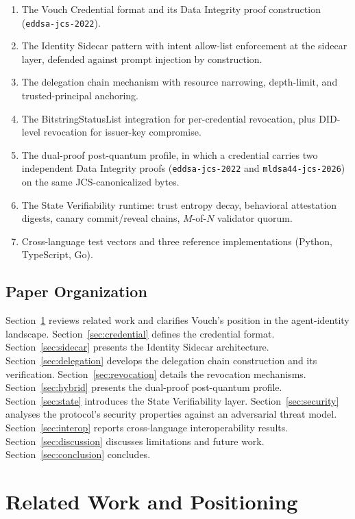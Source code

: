 \documentclass[11pt,a4paper,twocolumn]{article}
\begin{document}
\begin{enumerate}[label=\arabic*.,leftmargin=*]
\item The Vouch Credential format and its Data Integrity proof construction (\texttt{eddsa-jcs-2022}).
\item The Identity Sidecar pattern with intent allow-list enforcement at the sidecar layer, defended against prompt injection by construction.
\item The delegation chain mechanism with resource narrowing, depth-limit, and trusted-principal anchoring.
\item The BitstringStatusList integration for per-credential revocation, plus DID-level revocation for issuer-key compromise.
\item The dual-proof post-quantum profile, in which a credential carries two independent Data Integrity proofs (\texttt{eddsa-jcs-2022} and \texttt{mldsa44-jcs-2026}) on the same JCS-canonicalized bytes.
\item The State Verifiability runtime: trust entropy decay, behavioral attestation digests, canary commit/reveal chains, $M$-of-$N$ validator quorum.
\item Cross-language test vectors and three reference implementations (Python, TypeScript, Go).
\end{enumerate}

\subsection{Paper Organization}

Section~\ref{sec:related} reviews related work and clarifies Vouch's position in the agent-identity landscape. Section~\ref{sec:credential} defines the credential format. Section~\ref{sec:sidecar} presents the Identity Sidecar architecture. Section~\ref{sec:delegation} develops the delegation chain construction and its verification. Section~\ref{sec:revocation} details the revocation mechanisms. Section~\ref{sec:hybrid} presents the dual-proof post-quantum profile. Section~\ref{sec:state} introduces the State Verifiability layer. Section~\ref{sec:security} analyses the protocol's security properties against an adversarial threat model. Section~\ref{sec:interop} reports cross-language interoperability results. Section~\ref{sec:discussion} discusses limitations and future work. Section~\ref{sec:conclusion} concludes.

\section{Related Work and Positioning}
\label{sec:related}
\end{document}
